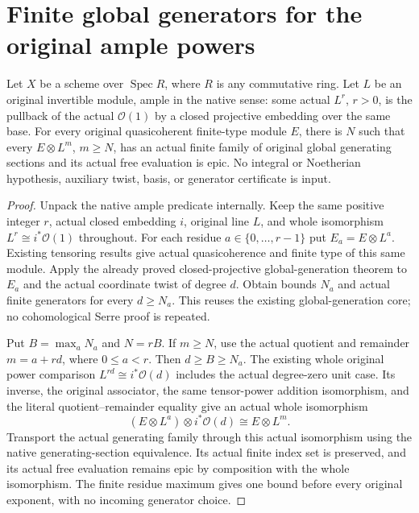 \section{Finite global generators for the original ample powers}
\begin{theorem}
\label{thm:original-native-ample-coherent-global-generation}
\leanok
Let $X$ be a scheme over $\operatorname{Spec}R$, where $R$ is any
commutative ring. Let $L$ be an original invertible module, ample in the
native sense: some actual $L^r$, $r>0$, is the pullback of the actual
$\mathcal O(1)$ by a closed projective embedding over the same base.
For every original quasicoherent finite-type module $E$, there is $N$
such that every $E\otimes L^m$, $m\geq N$, has an actual finite family of
original global generating sections and its actual free evaluation is epic.
No integral or Noetherian hypothesis, auxiliary twist, basis, or generator
certificate is input.
\end{theorem}
\begin{proof}
Unpack the native ample predicate internally. Keep the same positive
integer $r$, actual closed embedding $i$, original line $L$, and whole
isomorphism $L^r\cong i^*\mathcal O(1)$ throughout. For each residue
$a\in\{0,\ldots,r-1\}$ put $E_a=E\otimes L^a$. Existing tensoring
results give actual quasicoherence and finite type of this same module.
Apply the already proved closed-projective global-generation theorem to
$E_a$ and the actual coordinate twist of degree $d$. Obtain bounds $N_a$
and actual finite generators for every $d\geq N_a$. This reuses the
existing global-generation core; no cohomological Serre proof is repeated.

Put $B=\max_a N_a$ and $N=rB$. If $m\geq N$, use the actual quotient
and remainder $m=a+rd$, where $0\leq a<r$. Then $d\geq B\geq N_a$.
The existing whole original power comparison
$L^{rd}\cong i^*\mathcal O(d)$ includes the actual degree-zero unit
case. Its inverse, the original associator, the same tensor-power addition
isomorphism, and the literal quotient--remainder equality give an actual
whole isomorphism
\[
 (E\otimes L^a)\otimes i^*\mathcal O(d)\cong E\otimes L^m.
\]
Transport the actual generating family through this actual isomorphism
using the native generating-section equivalence. Its actual finite index
set is preserved, and its actual free evaluation remains epic by composition
with the whole isomorphism. The finite residue maximum gives one bound
before every original exponent, with no incoming generator choice.
\end{proof}
